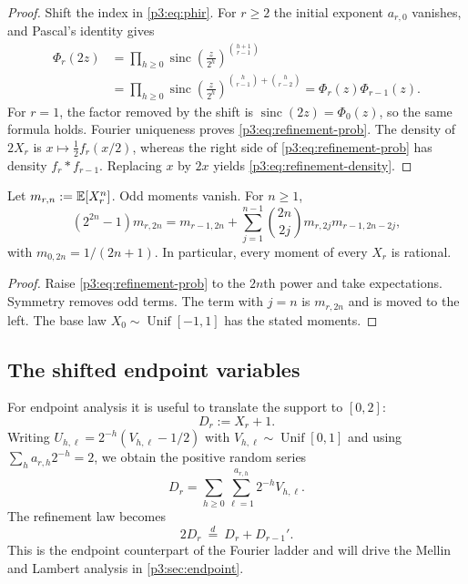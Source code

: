 \documentclass[11pt,oneside]{article}
\theoremstyle{definition}
\theoremstyle{remark}
\newcommand{\sinc}{\operatorname{sinc}}
\begin{document}
\begin{proof}
Shift the index in \eqref{p3:eq:phir}.  For $r\ge2$ the initial exponent $a_{r,0}$ vanishes, and Pascal's identity gives
\begin{align*}
 \Phi_r(2z)
 &=\prod_{h\ge0}\sinc\!\left(\frac z{2^h}\right)^{\binom{h+1}{r-1}}\\
 &=\prod_{h\ge0}\sinc\!\left(\frac z{2^h}\right)^{\binom h{r-1}+\binom h{r-2}}
 =\Phi_r(z)\Phi_{r-1}(z).
\end{align*}
For $r=1$, the factor removed by the shift is $\sinc(2z)=\Phi_0(z)$, so the same formula holds.  Fourier uniqueness proves \eqref{p3:eq:refinement-prob}.  The density of $2X_r$ is $x\mapsto \frac12 f_r(x/2)$, whereas the right side of \eqref{p3:eq:refinement-prob} has density $f_r*f_{r-1}$.  Replacing $x$ by $2x$ yields \eqref{p3:eq:refinement-density}.
\end{proof}

\begin{corollary}\label{p3:cor:moment-ladder}
Let $m_{r,n}:=\mathbb E[X_r^n]$.  Odd moments vanish.  For $n\ge1$,
\begin{equation}\label{p3:eq:moment-ladder}
 (2^{2n}-1)m_{r,2n}
 =m_{r-1,2n}
 +\sum_{j=1}^{n-1}\binom{2n}{2j}m_{r,2j}m_{r-1,2n-2j},
\end{equation}
with $m_{0,2n}=1/(2n+1)$.  In particular, every moment of every $X_r$ is rational.
\end{corollary}

\begin{proof}
Raise \eqref{p3:eq:refinement-prob} to the $2n$th power and take expectations.  Symmetry removes odd terms.  The term with $j=n$ is $m_{r,2n}$ and is moved to the left.  The base law $X_0\sim\operatorname{Unif}[-1,1]$ has the stated moments.
\end{proof}

\subsection{The shifted endpoint variables}

For endpoint analysis it is useful to translate the support to $[0,2]$:
\begin{equation}\label{p3:eq:Dr}
  D_r:=X_r+1.
\end{equation}
Writing $U_{h,\ell}=2^{-h}(V_{h,\ell}-1/2)$ with $V_{h,\ell}\sim\operatorname{Unif}[0,1]$ and using $\sum_h a_{r,h}2^{-h}=2$, we obtain the positive random series
\begin{equation}\label{p3:eq:Dr-series}
  D_r=\sum_{h\ge0}\sum_{\ell=1}^{a_{r,h}}2^{-h}V_{h,\ell}.
\end{equation}
The refinement law becomes
\begin{equation}\label{p3:eq:Dr-refine}
  2D_r\ \stackrel d=\ D_r+D_{r-1}'.
\end{equation}
This is the endpoint counterpart of the Fourier ladder and will drive the Mellin and Lambert analysis in \cref{p3:sec:endpoint}.
\end{document}
